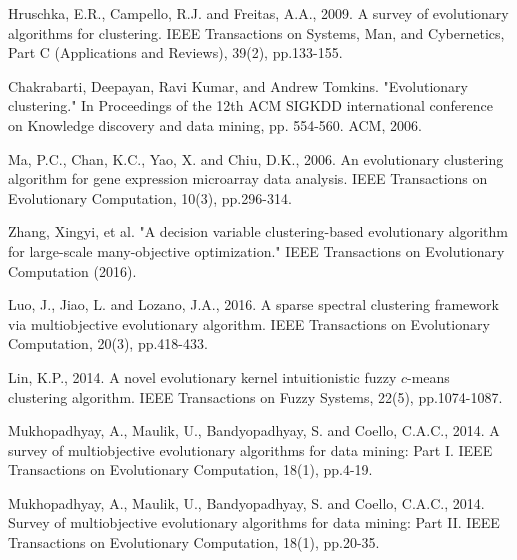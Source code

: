 \documentclass[conference]{IEEEtran}
\begin{document}
%
%
%
\begin{thebibliography}{}

Hruschka, E.R., Campello, R.J. and Freitas, A.A., 2009. A survey of evolutionary algorithms for clustering. IEEE Transactions on Systems, Man, and Cybernetics, Part C (Applications and Reviews), 39(2), pp.133-155.

Chakrabarti, Deepayan, Ravi Kumar, and Andrew Tomkins. "Evolutionary clustering." In Proceedings of the 12th ACM SIGKDD international conference on Knowledge discovery and data mining, pp. 554-560. ACM, 2006.

Ma, P.C., Chan, K.C., Yao, X. and Chiu, D.K., 2006. An evolutionary clustering algorithm for gene expression microarray data analysis. IEEE Transactions on Evolutionary Computation, 10(3), pp.296-314.

Zhang, Xingyi, et al. "A decision variable clustering-based evolutionary algorithm for large-scale many-objective optimization." IEEE Transactions on Evolutionary Computation (2016).

Luo, J., Jiao, L. and Lozano, J.A., 2016. A sparse spectral clustering framework via multiobjective evolutionary algorithm. IEEE Transactions on Evolutionary Computation, 20(3), pp.418-433.

Lin, K.P., 2014. A novel evolutionary kernel intuitionistic fuzzy $ c $-means clustering algorithm. IEEE Transactions on Fuzzy Systems, 22(5), pp.1074-1087.

Mukhopadhyay, A., Maulik, U., Bandyopadhyay, S. and Coello, C.A.C., 2014. A survey of multiobjective evolutionary algorithms for data mining: Part I. IEEE Transactions on Evolutionary Computation, 18(1), pp.4-19.

Mukhopadhyay, A., Maulik, U., Bandyopadhyay, S. and Coello, C.A.C., 2014. Survey of multiobjective evolutionary algorithms for data mining: Part II. IEEE Transactions on Evolutionary Computation, 18(1), pp.20-35.


\end{thebibliography}
\end{document}
